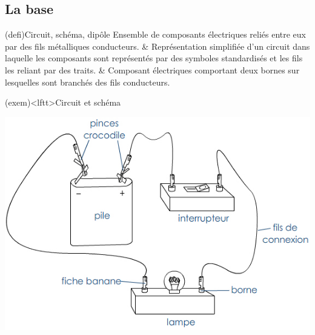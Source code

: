 \documentclass[../../main/main.tex]{subfiles}
\begin{document}
\subsection{La base}
\begin{tcb}[label=def:circuits, tabularx={Y|Y|Y}](defi){Circuit, schéma, dipôle}
	Ensemble de composants électriques reliés entre eux par des fils
	métalliques conducteurs. &
	Représentation simplifiée d'un circuit dans laquelle les composants sont
	représentés par des symboles standardisés et les fils les reliant par des
	traits. &
	Composant électriques comportant deux bornes sur lesquelles sont branchés
	des fils conducteurs.
\end{tcb}
\begin{tcb}[label=exem:circuits, sidebyside](exem)<lftt>{Circuit et schéma}
	\begin{center}
		\includegraphics[width=.7\linewidth]{circuit_simple_dessin.jpg}
	\end{center}
	\tcblower
	\begin{center}
\end{center}
\end{tcb}
\end{document}
